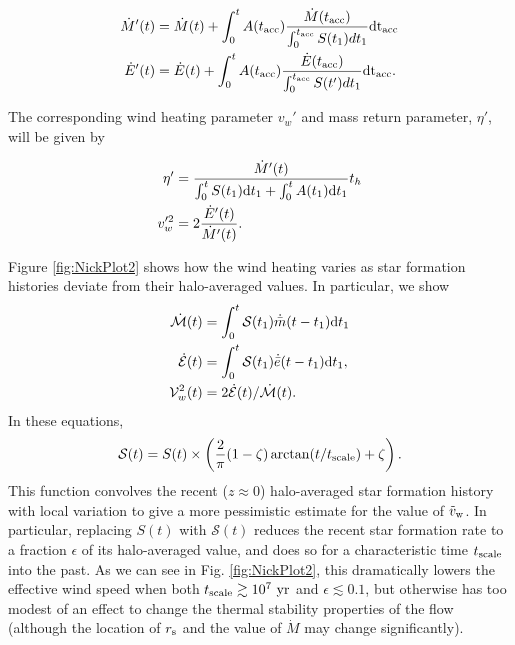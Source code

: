 \begin{align}
\dot{M} '(t)&=\dot{M}(t)+\int_{0}^{t} A(t_{\rm acc}) \frac{\dot{M}(t_{\rm acc})}
{\int_{0}^{t_{\rm acc}} S(t_1) dt_1} {\rm dt_{ acc}}\\
\dot{E}'(t)&=\dot{E}(t)+\int_{0}^{t} A(t_{\rm acc}) \frac{\dot{E}(t_{\rm acc})}
{\int_{0}^{t_{\rm acc}} S(t') dt_1} {\rm dt_{acc}}.
\end{align}

The corresponding wind heating parameter $v_w'$ and mass return
parameter, $\eta'$, will be given by

\begin{align}
\eta'&=\frac{\dot{M}'(t)}{\int_0^t S(t_1) {\rm d}t_1+\int_0^t A(t_1) {\rm
    d}t_1} t_h\\
v_w'^2&=2 \frac{\dot{E}'(t)}{\dot{M}'(t)}.
\end{align}

Figure \ref{fig:NickPlot2} shows how the wind heating varies as star formation histories deviate from their halo-averaged values.  In particular, we show
\begin{align} 
  \dot{\mathcal{M}}(t) &= \int_0^t \mathcal{S}(t_1) \dot{\bar{m}}(t-t_1){\rm
      d}t_1\\
  \dot{\mathcal{E}}(t) &= \int_0^t \mathcal{S}(t_1) \dot{\bar{e}}(t-t_1){\rm
      d}t_1,\\
  \mathcal{V}_w^2(t) &=2 \dot{\mathcal{E}}(t)/\dot{\mathcal{M}}(t).
\end{align}
In these equations, 
\begin{equation}
\mathcal{S}(t) = S(t) \times \left(\frac{2}{\pi}(1-\zeta)\arctan(t/t_{\rm scale}) + \zeta \right).
\end{equation}
This function convolves the recent ($z \approx 0$) halo-averaged star formation history with local variation to give a more pessimistic estimate for the value of $\tilde{v}_{\rm w}$.  In particular, replacing $S(t)$ with $\mathcal{S}(t)$ reduces the recent star formation rate to a fraction $\epsilon$ of its halo-averaged value, and does so for a characteristic time $t_{\rm scale}$ into the past.  As we can see in Fig. \ref{fig:NickPlot2}, this dramatically lowers the effective wind speed when both $t_{\rm scale} \gtrsim 10^7 ~{\rm yr}$ and $\epsilon \lesssim 0.1$, but otherwise has too modest of an effect to change the thermal stability properties of the flow (although the location of $r_{\rm s}$ and the value of $\dot{M}$ may change significantly).


